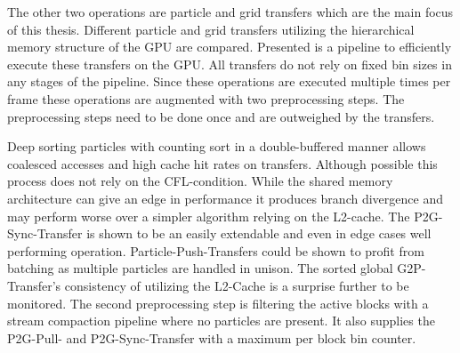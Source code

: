 \documentclass[m,times]{cgMA}
\begin{document}
The other two operations are particle and grid transfers which are the main focus of this thesis. Different particle and grid transfers utilizing the hierarchical memory structure of the GPU are compared. Presented is a pipeline to efficiently execute these transfers on the GPU. All transfers do not rely on fixed bin sizes in any stages of the pipeline. Since these operations are executed multiple times per frame these operations are augmented with two preprocessing steps. The preprocessing steps need to be done once and are outweighed by the transfers.

Deep sorting particles with counting sort in a double-buffered manner allows coalesced accesses and high cache hit rates on transfers. Although possible this process does not rely on the CFL-condition. While the shared memory architecture can give an edge in performance it produces branch divergence and may perform worse over a simpler algorithm relying on the L2-cache. The P2G-Sync-Transfer is shown to be an easily extendable and even in edge cases well performing operation. Particle-Push-Transfers could be shown to profit from batching as multiple particles are handled in unison. The sorted global G2P-Transfer's consistency of utilizing the L2-Cache is a surprise further to be monitored. The second preprocessing step is filtering the active blocks with a stream compaction pipeline where no particles are present. It also supplies the P2G-Pull- and P2G-Sync-Transfer with a maximum per block bin counter.
\end{document}
